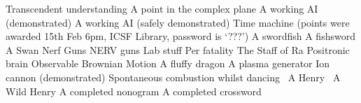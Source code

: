 \begin{multicols}{2}
\begin{small}
\begin{tabbing}
           {Transcendent understanding}
          {A point in the complex plane}
           {A working AI (demonstrated)}
          {A working AI (safely demonstrated)}
        {Time machine (points were awarded 15th Feb 6pm,
        ICSF Library, password is `???')}
          {A swordfish}
          {A fishsword}
          {A Swan}
           {Nerf Guns}
           {NERV guns}
          {Lab stuff}
         {Per fatality}
          {The Staff of Ra}
           {Positronic brain}
           {Observable Brownian Motion}
           {A fluffy dragon}
           {A plasma generator}
           {Ion cannon (demonstrated)}
         {Spontaneous combustion whilst dancing~\E}
           {A Henry~\E}
          {A Wild Henry}
          {A completed nonogram}
          {A completed crossword}
    \end{tabbing}
  \end{small}
\end{multicols}

\vfill

\begin{center}
\end{center}

\vfill

